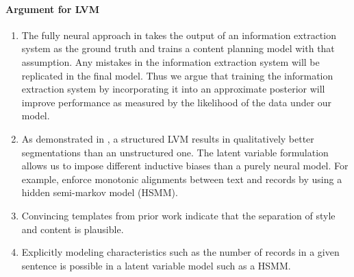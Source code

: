 \documentclass[11pt]{article}
\begin{document}
\paragraph{Argument for LVM}
\begin{enumerate}
\item The fully neural approach in \citep{puduppully2018contentselection} takes the output of
an information extraction system as the ground truth and trains a content planning model with
that assumption.
Any mistakes in the information extraction system will be replicated in the final model.
Thus we argue that training the information extraction system by incorporating it
into an approximate posterior will improve performance as measured by
the likelihood of the data under our model.
\item As demonstrated in \citep{liang2009semalign},
a structured LVM results in qualitatively better segmentations than an unstructured one.
The latent variable formulation allows us to impose different inductive biases than a 
purely neural model.
For example, \citep{liang2009semalign} enforce monotonic alignments between text and records by using a 
hidden semi-markov model (HSMM).
\item Convincing templates from prior work \citep{wiseman2018template} indicate that the separation of
style and content is plausible.
\item Explicitly modeling characteristics such as the number of records in a given
sentence is possible in a latent variable model such as a HSMM.
\end{enumerate}
\end{document}
